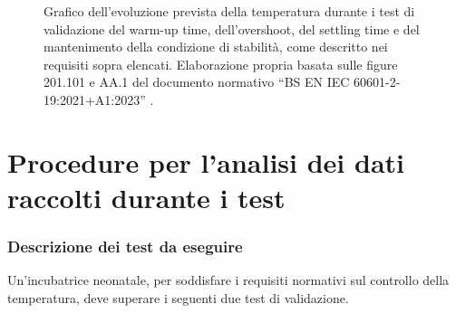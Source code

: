\begin{figure}[htbp]
	\caption[Grafico della temperatura nel test di validazione]{Grafico dell'evoluzione prevista della temperatura durante
	i test di validazione del warm-up time, dell'overshoot, del settling time e del mantenimento della condizione di stabilità,
	come descritto nei requisiti sopra elencati. Elaborazione propria basata sulle figure 201.101 e AA.1 del documento normativo
	``BS EN IEC 60601-2-19:2021+A1:2023'' \cite{bs_60601_2_19}.}
	\label{fig:requisiti_norma}
\end{figure}

\newpage

\section{Procedure per l'analisi dei dati raccolti durante i test}
\subsubsection{Descrizione dei test da eseguire}
Un'incubatrice neonatale, per soddisfare i requisiti normativi sul controllo della temperatura, deve superare i
seguenti due test di validazione.

